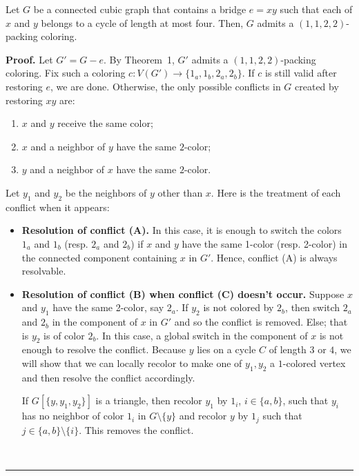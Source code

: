 \documentclass[10pt,a4paper]{amsart}
\newenvironment{proof}[1][Proof]{\textbf{#1.} }{\ \rule{0.5em}{0.5em}}
\begin{document}
\begin{corollary}
Let $G$ be a connected cubic graph that contains a bridge $e = xy$ such that each of $x$ and $y$ belongs to a cycle of length at most four. 
Then, $G$ admits a $(1,1,2,2)$-packing coloring.
\end{corollary}

\begin{proof}
Let $G' = G - e$. By Theorem~1, $G'$ admits a $(1,1,2,2)$-packing coloring. Fix such a coloring $c : V(G') \to \{1_a,1_b,2_a,2_b\}$. If $c$ is still valid after restoring $e$, we are done. Otherwise, the only possible conflicts in $G$ created by restoring $xy$ are:
\begin{enumerate}
  \item[\textup{(A)}] $x$ and $y$ receive the same color;
  \item[\textup{(B)}] $x$ and a neighbor of $y$ have the same $2$-color;
  \item[\textup{(C)}] $y$ and a neighbor of $x$ have the same $2$-color.
\end{enumerate}
 Let $y_1$ and $y_2$ be the neighbors of $y$ other than $x$. Here is the treatment of each conflict when it appears:\begin{itemize}
 \item \textbf{Resolution of conflict (A).}
 In this case, it is enough to switch the colors $1_a$ and $1_b$ (resp. $2_a$ and $2_b$) if $x$ and $y$ have the same 1-color (resp. 2-color) in the connected component containing $x$ in $G'$. Hence, conflict (A) is always resolvable.
 
\item \textbf{Resolution of conflict (B) when conflict (C) doesn't occur.} 
 Suppose $x$ and $y_1$ have the same 2-color, say $2_a$. If $y_2$ is not colored by $2_b$, then switch $2_a$ and $2_b$ in the  component of $x$ in $G'$ and so the conflict is removed. Else; that is $y_2$ is of color $2_b$. In this case, a global switch in the component of $x$ is not enough to resolve the conflict. Because $y$ lies on a cycle $C$ of length $3$ or $4$, we will show that we can locally recolor to make one of $y_1,y_2$ a $1$-colored vertex and then resolve the conflict accordingly.

If $G[\{y,y_1,y_2\}]$ is a triangle, then recolor $y_1$ by $1_i$, $i\in\{a,b\}$, such that $y_i$ has no neighbor of color $1_i$ in $G\setminus \{y\}$ and recolor $y$ by $1_j$ such that $j\in \{a,b\}\setminus\{i\}$. This removes the conflict. 


\end{itemize}
\end{proof}
\end{document}
